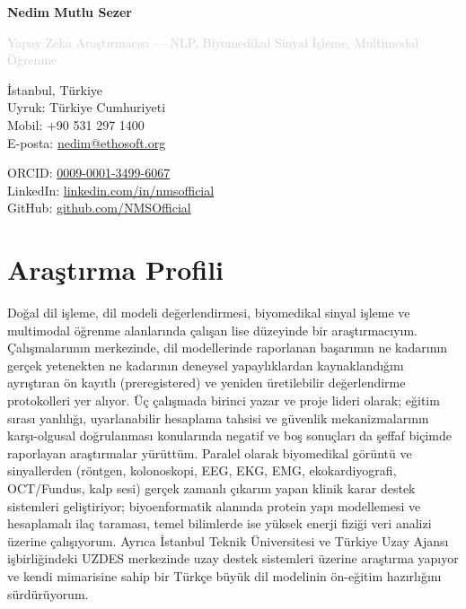 \documentclass[11pt,a4paper]{article}
\begin{document}
{\Huge \textbf{\textcolor{titleblue}{Nedim Mutlu Sezer}}}

\vspace{0.25em}
{\large \textcolor{lightgray}{Yapay Zeka Araştırmacısı --- NLP, Biyomedikal Sinyal İşleme, Multimodal Öğrenme}}

\vspace{0.5em}

\begin{minipage}[t]{0.48\textwidth}
İstanbul, Türkiye \\
Uyruk: Türkiye Cumhuriyeti \\
Mobil: +90 531 297 1400 \\
E-posta: \href{mailto:nedim@ethosoft.org}{nedim@ethosoft.org}
\end{minipage}
\begin{minipage}[t]{0.48\textwidth}
ORCID: \href{https://orcid.org/0009-0001-3499-6067}{0009-0001-3499-6067} \\
LinkedIn: \href{https://linkedin.com/in/nmsofficial}{linkedin.com/in/nmsofficial} \\
GitHub: \href{https://github.com/NMSOfficial}{github.com/NMSOfficial}
\end{minipage}

\vspace{0.4em}

\section*{Araştırma Profili}
Doğal dil işleme, dil modeli değerlendirmesi, biyomedikal sinyal işleme ve multimodal öğrenme alanlarında çalışan lise düzeyinde bir araştırmacıyım. Çalışmalarımın merkezinde, dil modellerinde raporlanan başarımın ne kadarının gerçek yetenekten ne kadarının deneysel yapaylıklardan kaynaklandığını ayrıştıran ön kayıtlı (preregistered) ve yeniden üretilebilir değerlendirme protokolleri yer alıyor. Üç çalışmada birinci yazar ve proje lideri olarak; eğitim sırası yanlılığı, uyarlanabilir hesaplama tahsisi ve güvenlik mekanizmalarının karşı-olgusal doğrulanması konularında negatif ve boş sonuçları da şeffaf biçimde raporlayan araştırmalar yürüttüm. Paralel olarak biyomedikal görüntü ve sinyallerden (röntgen, kolonoskopi, EEG, EKG, EMG, ekokardiyografi, OCT/Fundus, kalp sesi) gerçek zamanlı çıkarım yapan klinik karar destek sistemleri geliştiriyor; biyoenformatik alanında protein yapı modellemesi ve hesaplamalı ilaç taraması, temel bilimlerde ise yüksek enerji fiziği veri analizi üzerine çalışıyorum. Ayrıca İstanbul Teknik Üniversitesi ve Türkiye Uzay Ajansı işbirliğindeki UZDES merkezinde uzay destek sistemleri üzerine araştırma yapıyor ve kendi mimarisine sahip bir Türkçe büyük dil modelinin ön-eğitim hazırlığını sürdürüyorum.
\end{document}
